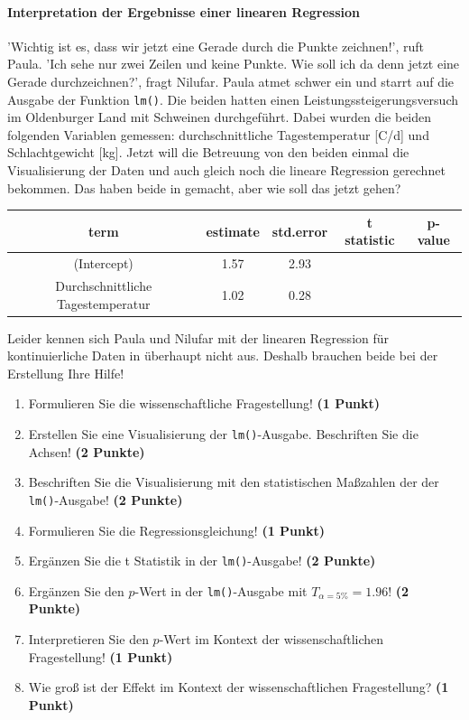 \documentclass[a4paper, 9pt]{scrartcl}\usepackage[]{graphicx}\usepackage[]{xcolor}
\begin{document}
\ifcollection
\paragraph{Interpretation der Ergebnisse einer linearen Regression}
\fi

'Wichtig ist es, dass wir jetzt eine Gerade durch die Punkte zeichnen!', ruft Paula. 'Ich sehe nur zwei Zeilen und keine Punkte. Wie soll ich da denn jetzt eine Gerade durchzeichnen?', fragt Nilufar. Paula atmet schwer ein und starrt auf die \Rlogo Ausgabe der Funktion \texttt{lm()}. Die beiden hatten einen Leistungssteigerungsversuch im Oldenburger Land mit Schweinen durchgeführt. Dabei wurden die beiden folgenden Variablen gemessen: durchschnittliche Tagestemperatur [C/d] und Schlachtgewicht [kg]. Jetzt will die Betreuung von den beiden einmal die Visualisierung der Daten und auch gleich noch die lineare Regression gerechnet bekommen. Das haben beide in \Rlogo gemacht, aber wie soll das jetzt gehen?

\begin{table}[!h]
\centering\begingroup\fontsize{11}{13}\selectfont

\begin{tabular}{ccccc}
\toprule
term & estimate & std.error & t statistic & p-value\\
\midrule
(Intercept) & 1.57 & 2.93 &  & \\
Durchschnittliche Tagestemperatur & 1.02 & 0.28 &  & \\
\bottomrule
\end{tabular}
\endgroup{}
\end{table}



Leider kennen sich Paula und Nilufar mit der linearen Regression für kontinuierliche Daten in \Rlogo überhaupt nicht aus. Deshalb brauchen beide bei der Erstellung Ihre Hilfe!

\begin{enumerate}
\item Formulieren Sie die wissenschaftliche Fragestellung! \textbf{(1 Punkt)}
\item Erstellen  Sie  eine  Visualisierung  der \texttt{lm()}-Ausgabe.  Beschriften  Sie  die  Achsen! \textbf{(2 Punkte)}
\item Beschriften Sie die Visualisierung mit den statistischen Maßzahlen der der \texttt{lm()}-Ausgabe! \textbf{(2 Punkte)}
\item Formulieren Sie die Regressionsgleichung! \textbf{(1 Punkt)}
\item Ergänzen Sie die t Statistik in der \texttt{lm()}-Ausgabe! \textbf{(2 Punkte)}
\item Ergänzen Sie den $p$-Wert in der \texttt{lm()}-Ausgabe mit $T_{\alpha = 5\%} = 1.96$!  \textbf{(2 Punkte)}
\item Interpretieren Sie den $p$-Wert im Kontext der wissenschaftlichen Fragestellung! \textbf{(1 Punkt)}  
\item Wie groß ist der Effekt im Kontext der wissenschaftlichen Fragestellung? \textbf{(1 Punkt)}
\end{enumerate} 
\clearpage
\end{document}
